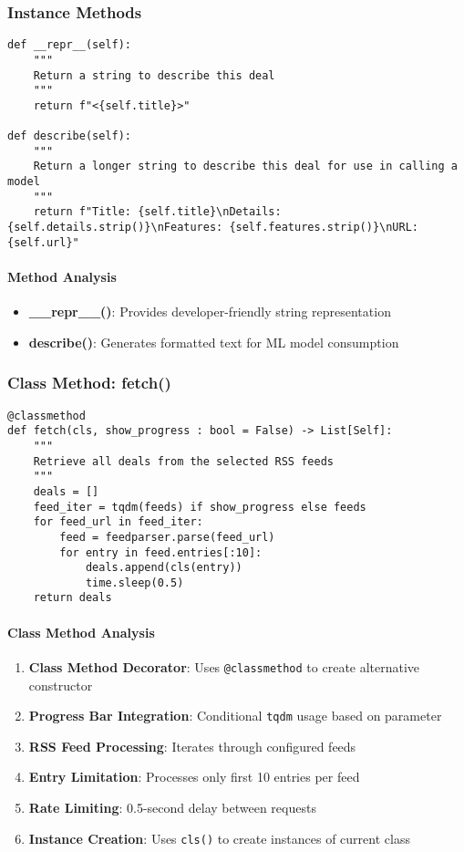 \subsubsection{Instance Methods}

\begin{lstlisting}[caption=ScrapedDeal Instance Methods]
def __repr__(self):
    """
    Return a string to describe this deal
    """
    return f"<{self.title}>"

def describe(self):
    """
    Return a longer string to describe this deal for use in calling a model
    """
    return f"Title: {self.title}\nDetails: {self.details.strip()}\nFeatures: {self.features.strip()}\nURL: {self.url}"
\end{lstlisting}

\paragraph{Method Analysis}
\begin{itemize}
\item \textbf{\_\_repr\_\_()}: Provides developer-friendly string representation
\item \textbf{describe()}: Generates formatted text for ML model consumption
\end{itemize}

\subsubsection{Class Method: fetch()}

\begin{lstlisting}[caption=ScrapedDeal.fetch() Class Method]
@classmethod
def fetch(cls, show_progress : bool = False) -> List[Self]:
    """
    Retrieve all deals from the selected RSS feeds
    """
    deals = []
    feed_iter = tqdm(feeds) if show_progress else feeds
    for feed_url in feed_iter:
        feed = feedparser.parse(feed_url)
        for entry in feed.entries[:10]:
            deals.append(cls(entry))
            time.sleep(0.5)
    return deals
\end{lstlisting}

\paragraph{Class Method Analysis}
\begin{enumerate}
\item \textbf{Class Method Decorator}: Uses \texttt{@classmethod} to create alternative constructor
\item \textbf{Progress Bar Integration}: Conditional \texttt{tqdm} usage based on parameter
\item \textbf{RSS Feed Processing}: Iterates through configured feeds
\item \textbf{Entry Limitation}: Processes only first 10 entries per feed
\item \textbf{Rate Limiting}: 0.5-second delay between requests
\item \textbf{Instance Creation}: Uses \texttt{cls()} to create instances of current class
\end{enumerate}

